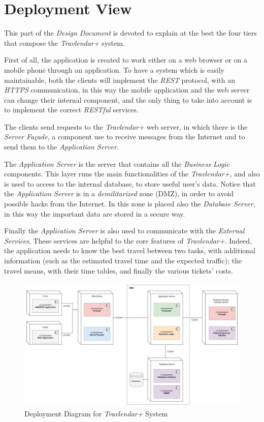 \section{Deployment View}
This part of the \emph{Design Document} is devoted to explain at the best the four tiers that compose the \emph{Travlendar+} system.

First of all, the application is created to work either on a web browser or on a mobile phone through an application.
To have a system which is easily maintainable, both the clients will implement the \emph{REST} protocol, with an \emph{HTTPS} communication, in this way the mobile application and the web server can change their internal component, and the only thing to take into account is to implement the correct \emph{RESTful} services.

The clients send requests to the \emph{Travlendar+} web server, in which there is the \emph{Server Façade}, a component use to receive messages from the Internet and to send them to the \emph{Application Server}.

The \emph{Application Server} is the server that contains all the \emph{Business Logic} components. This layer runs the main functionalities of the \emph{Travlendar+}, and also is used to access to the internal database, to store useful user's data. Notice that the \emph{Application Server} is in a \emph{demilitarized} zone (DMZ), in order to avoid possible hacks from the Internet. In this zone is placed also the \emph{Database Server}, in this way the important data are stored in a secure way.

Finally the \emph{Application Server} is also used to communicate with the \emph{External Services}. These services are helpful to the core features of \emph{Travlendar+}. Indeed, the application needs to know the best travel between two tasks, with additional information (such as the estimated travel time and the expected traffic); the travel means, with their time tables, and finally the various tickets' costs.

\begin{figure}[H]
    \centering
    \includegraphics[scale=0.9]{Pictures/DeploymentPictures/deploymentDiagram.jpg}
    \caption{Deployment Diagram for \emph{Travlendar+} System}
\end{figure}